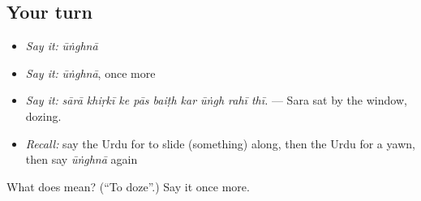 \subsection*{Your turn}
\begin{itemize}
\raggedright
  \item \emph{Say it:} \emph{ūṅghnā}
  \item \emph{Say it:} \emph{ūṅghnā}, once more
  \item \emph{Say it:} \emph{sārā khiṛkī ke pās baiṭh kar ūṅgh rahī thī.} — Sara sat by the window, dozing.
  \item \emph{Recall:} say the Urdu for to slide (something) along, then the Urdu for a yawn, then say \emph{ūṅghnā} again
\end{itemize}

\begin{tcolorbox}[breakable,colback=teal!4,colframe=teal!35!black,title={Before you move on}]
What does  mean? (\textquotedblleft{}To doze\textquotedblright{}.) Say it once more.
\end{tcolorbox}
